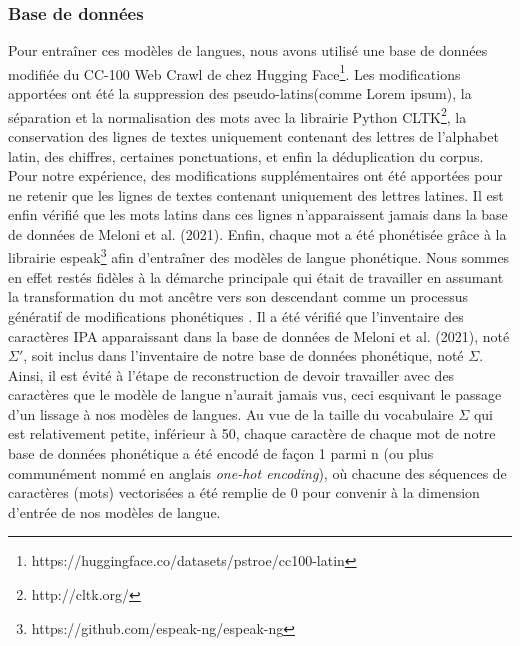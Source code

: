 \documentclass[10pt, french]{article}
\begin{document}
\begin{multicols*}{2}
\subsubsection{Base de données}
Pour entraîner ces modèles de langues, nous avons utilisé une base de données modifiée du CC-100 Web Crawl de 
chez Hugging Face\footnote{ https://huggingface.co/datasets/pstroe/cc100-latin}. Les modifications apportées 
ont été la suppression des \og pseudo-latins\fg (comme \og Lorem ipsum\fg), la séparation et la normalisation 
des mots avec la librairie Python CLTK\footnote{http://cltk.org/}, la conservation des lignes de textes 
uniquement contenant des lettres de l'alphabet latin, des chiffres, certaines ponctuations, et enfin la déduplication du corpus. Pour notre expérience, des modifications supplémentaires ont été apportées pour ne retenir que les lignes de textes contenant uniquement des lettres latines. Il est enfin vérifié que les mots latins dans ces lignes n'apparaissent jamais dans la base de données de Meloni et al. (2021). Enfin, chaque mot a été phonétisée grâce à la librairie espeak\footnote{https://github.com/espeak-ng/espeak-ng} afin d'entraîner des modèles de langue phonétique. Nous sommes en effet restés fidèles à la démarche principale qui était de travailler en assumant la transformation du mot ancêtre vers son descendant comme un processus génératif de modifications phonétiques \cite{andre}. Il a été vérifié que l'inventaire des caractères IPA apparaissant dans la base de données de Meloni et al. (2021)\cite{meloni}, noté $\Sigma'$, soit inclus dans l'inventaire de notre base de données phonétique, noté $\Sigma$. Ainsi, il est évité à l'étape de reconstruction de devoir travailler avec des caractères que le modèle de langue n'aurait jamais vus, ceci esquivant le passage d'un lissage à nos modèles de langues. 
Au vue de la taille du vocabulaire $\Sigma$ qui est relativement petite, inférieur à 50, chaque caractère de chaque mot de notre base de données phonétique a été encodé de façon 1 parmi n (ou plus communément nommé en anglais \textit{one-hot encoding}), où chacune des séquences de caractères (mots) vectorisées a été remplie de 0 pour convenir à la dimension d'entrée de nos modèles de langue.


\end{multicols*}
\end{document}
